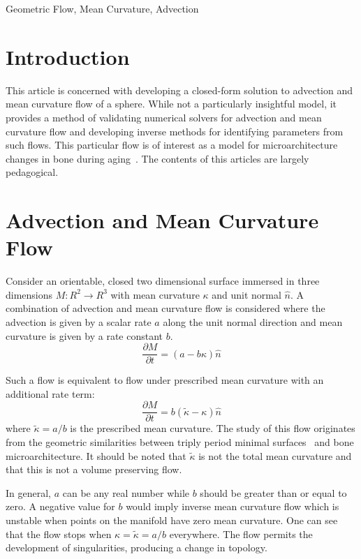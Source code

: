 \documentclass[journal]{IEEEtran}
\begin{document}
\begin{IEEEkeywords}
Geometric Flow, Mean Curvature, Advection
\end{IEEEkeywords}

\section{Introduction}
This article is concerned with developing a closed-form solution to advection and mean curvature flow of a sphere.
While not a particularly insightful model, it provides a method of validating numerical solvers for advection and mean curvature flow and developing inverse methods for identifying parameters from such flows.
This particular flow is of interest as a model for microarchitecture changes in bone  during aging~\cite{besler2018bone}.
The contents of this articles are largely pedagogical.

\section{Advection and Mean Curvature Flow}
Consider an orientable, closed two dimensional surface immersed in three dimensions $M \colon \!R^2 \rightarrow \!R^3$ with mean curvature $\kappa$ and unit normal $\hat{n}$.
A combination of advection and mean curvature flow is considered where the advection is given by a scalar rate $a$ along the unit normal direction and mean curvature is given by a rate constant $b$.
\begin{equation}
  \label{eqn:advection-mean}
  \frac{\partial M}{\partial t} = (a - b \kappa) \hat{n}
\end{equation}

Such a flow is equivalent to flow under prescribed mean curvature with an additional rate term:
\begin{equation}
  \frac{\partial M}{\partial t} = b(\tilde{\kappa} - \kappa) \hat{n}
\end{equation}
where $\tilde{\kappa} = a/b$ is the prescribed mean curvature.
The study of this flow originates from the geometric similarities between triply period minimal surfaces~\cite{schoen1970infinite,anderson1987periodic,chopp1993flow} and bone microarchitecture.
It should be noted that $\tilde{\kappa}$ is not the total mean curvature and that this is not a volume preserving flow.

In general, $a$ can be any real number while $b$ should be greater than or equal to zero.
A negative value for $b$ would imply inverse mean curvature flow which is unstable when points on the manifold have zero mean curvature.
One can see that the flow stops when $\kappa = \tilde{\kappa} = a/b$ everywhere.
The flow permits the development of singularities, producing a change in topology.
\end{document}
